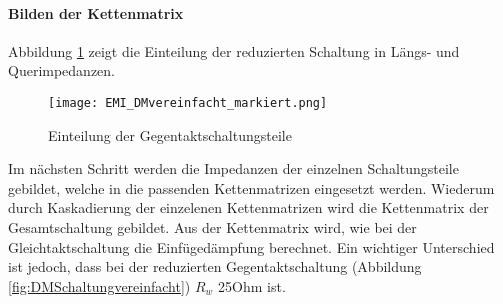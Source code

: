 \paragraph{Bilden der Kettenmatrix}\label{para:kettenGegentakt}
Abbildung \ref{fig:dmschaltungEingeteilt} zeigt die Einteilung der reduzierten Schaltung in Längs- und Querimpedanzen.
 
\begin{figure}[H]
		\centering
		\texttt{[image: EMI\_DMvereinfacht\_markiert.png]}
		\label{fig:dmschaltungEingeteilt}
		\caption{Einteilung der Gegentaktschaltungsteile}
\end{figure}

Im nächsten Schritt werden die Impedanzen der einzelnen Schaltungsteile gebildet, welche in die passenden Kettenmatrizen eingesetzt werden.
Wiederum durch Kaskadierung der einzelenen Kettenmatrizen wird die Kettenmatrix der Gesamtschaltung gebildet. Aus der Kettenmatrix wird, wie bei der Gleichtaktschaltung die Einfügedämpfung berechnet. Ein wichtiger Unterschied ist jedoch, dass bei der reduzierten Gegentaktschaltung (Abbildung \ref{fig:DMSchaltungvereinfacht}) $R_w$ 25Ohm ist. 


